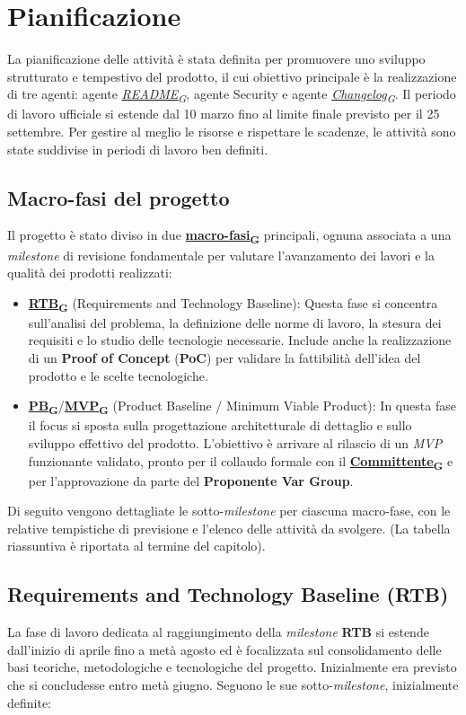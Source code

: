 \documentclass[12pt, a4paper]{article}
\newcommand{\urlglossario}{https://skynetunigroup.github.io/Code_Guardian/Documentazione/PB/glossario_v2.0.0.pdf} %
\newcommand{\glo}[2]{\href{\urlglossario\#nameddest=#2}{#1\textsubscript{G}}}
\begin{document}
{\newpage
\section{Pianificazione}

La pianificazione delle attività è stata definita per promuovere uno sviluppo strutturato e tempestivo del prodotto, il cui obiettivo principale è la realizzazione di tre agenti: agente \textit{\glo{README}{readme}}, agente Security e agente \textit{\glo{Changelog}{changelog}}.
Il periodo di lavoro ufficiale si estende dal 10 marzo fino al limite finale previsto per il 25 settembre. Per gestire al meglio le risorse e rispettare le scadenze, le attività sono state suddivise in periodi di lavoro ben definiti.

\subsection{\textbf{Macro-fasi} del progetto}
Il progetto è stato diviso in due \textbf{\glo{macro-fasi}{macro-fasi}} principali, ognuna associata a una \textit{milestone} di revisione fondamentale per valutare l'avanzamento dei lavori e la qualità dei prodotti realizzati:

\begin{itemize}
    \item \textbf{\glo{RTB}{rtb}} (Requirements and Technology Baseline): Questa fase si concentra sull'analisi del problema, la definizione delle norme di lavoro, la stesura dei requisiti e lo studio delle tecnologie necessarie.
Include anche la realizzazione di un \textbf{Proof of Concept} (\textbf{PoC}) per validare la fattibilità dell'idea del prodotto e le scelte tecnologiche.
\item \textbf{\glo{PB}{pb}}/\textbf{\glo{MVP}{mvp}} (Product Baseline / Minimum Viable Product): In questa fase il focus si sposta sulla progettazione architetturale di dettaglio e sullo sviluppo effettivo del prodotto.
L'obiettivo è arrivare al rilascio di un \textit{MVP} funzionante validato, pronto per il collaudo formale con il \textbf{\glo{Committente}{committente}} e per l'approvazione da parte del \textbf{Proponente Var Group}.
\end{itemize}

Di seguito vengono dettagliate le sotto-\textit{milestone} per ciascuna macro-fase, con le relative tempistiche di previsione e l'elenco delle attività da svolgere.
(La tabella riassuntiva è riportata al termine del capitolo).

\subsection{Requirements and Technology Baseline (\textbf{RTB})}
La fase di lavoro dedicata al raggiungimento della \textit{milestone} \textbf{RTB} si estende dall'inizio di aprile fino a metà agosto ed è focalizzata sul consolidamento delle basi teoriche, metodologiche e tecnologiche del progetto. Inizialmente era previsto che si concludesse entro metà giugno. Seguono le sue sotto-\textit{milestone}, inizialmente definite:

}
\end{document}
